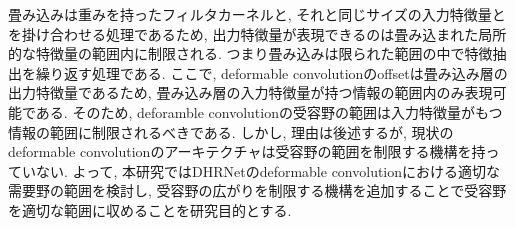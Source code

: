 畳み込みは重みを持ったフィルタカーネルと, それと同じサイズの入力特徴量とを掛け合わせる処理であるため, 出力特徴量が表現できるのは畳み込まれた局所的な特徴量の範囲内に制限される. つまり畳み込みは限られた範囲の中で特徴抽出を繰り返す処理である. ここで, deformable convolutionのoffsetは畳み込み層の出力特徴量であるため, 畳み込み層の入力特徴量が持つ情報の範囲内のみ表現可能である.
そのため, deforamble convolutionの受容野の範囲は入力特徴量がもつ情報の範囲に制限されるべきである. しかし, 理由は後述するが, 現状のdeformable convolutionのアーキテクチャは受容野の範囲を制限する機構を持っていない. よって, 本研究ではDHRNetのdeformable convolutionにおける適切な需要野の範囲を検討し, 受容野の広がりを制限する機構を追加することで受容野を適切な範囲に収めることを研究目的とする.